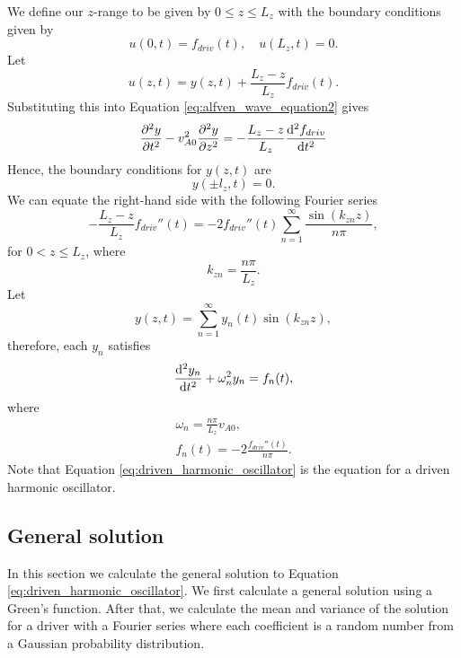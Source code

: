 We define our $z$-range to be given by $0\le z\le L_z$ with the boundary conditions given by
\begin{equation}
    u(0,t) = f_{driv}(t),\quad u(L_z,t) = 0.
\end{equation}
Let
\begin{equation}
    u(z,t) = y(z,t) + \frac{L_z - z}{L_z}f_{driv}(t).
\end{equation}
Substituting this into Equation \eqref{eq:alfven_wave_equation2} gives
\begin{equation}
    \begin{aligned}
    \pdv[2]{y}{t}-v_{A0}^2\pdv[2]{y}{z}&=-\frac{L_z - z}{L_z}\dv[2]{f_{driv}}{t} \\
    \end{aligned}
\end{equation}
Hence, the boundary conditions for $y(z,t)$ are
\begin{equation}
    y(\pm l_z, t) = 0.
\end{equation}
We can equate the right-hand side with the following Fourier series
\begin{equation}
    -\frac{L_z - z}{L_z}f_{driv}''(t) = -2f_{driv}''(t)\sum_{n=1}^\infty \frac{\sin(k_{zn} z)}{n\pi},
\end{equation}
for $0<z\le L_z$, where
\begin{equation}
    k_{zn} = \frac{n\pi}{L_z}.
\end{equation}
Let
\begin{equation}
    y(z,t) = \sum_{n=1}^\infty y_n(t)\sin(k_{zn}z),
\end{equation}
therefore, each $y_n$ satisfies
\begin{equation}
    \label{eq:driven_harmonic_oscillator}
    \dv[2]{y_n}{t} + \omega_n^2y_n=f_n(t),
\end{equation}
where 
\begin{gather}
    \omega_n = \frac{n\pi}{L_z}v_{A0}, \\
    f_n(t) = -2\frac{f_{driv}''(t)}{n\pi}.
\end{gather}
Note that Equation \eqref{eq:driven_harmonic_oscillator} is the equation for a driven harmonic oscillator.

\subsection{General solution}

In this section we calculate the general solution to Equation \eqref{eq:driven_harmonic_oscillator}. We first calculate a general solution using a Green's function. After that, we calculate the mean and variance of the solution for a driver with a Fourier series where each coefficient is a random number from a Gaussian probability distribution.

